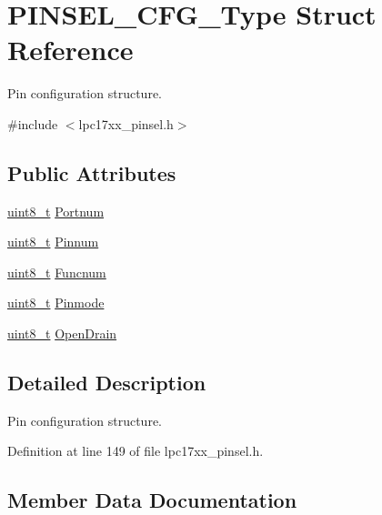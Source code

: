 \hypertarget{struct_p_i_n_s_e_l___c_f_g___type}{}\section{P\+I\+N\+S\+E\+L\+\_\+\+C\+F\+G\+\_\+\+Type Struct Reference}
\label{struct_p_i_n_s_e_l___c_f_g___type}


Pin configuration structure.  




{\ttfamily \#include $<$lpc17xx\+\_\+pinsel.\+h$>$}

\subsection*{Public Attributes}
\begin{DoxyCompactItemize}
\item 
\hyperlink{_p_e___types_8h_aba7bc1797add20fe3efdf37ced1182c5}{uint8\+\_\+t} \hyperlink{struct_p_i_n_s_e_l___c_f_g___type_a6b754912548dadd6634bb39c8b760fd1}{Portnum}
\item 
\hyperlink{_p_e___types_8h_aba7bc1797add20fe3efdf37ced1182c5}{uint8\+\_\+t} \hyperlink{struct_p_i_n_s_e_l___c_f_g___type_a6d439a871adb445a571aa28806593532}{Pinnum}
\item 
\hyperlink{_p_e___types_8h_aba7bc1797add20fe3efdf37ced1182c5}{uint8\+\_\+t} \hyperlink{struct_p_i_n_s_e_l___c_f_g___type_a3a18a3aab63914a40dad89c8272ad4f4}{Funcnum}
\item 
\hyperlink{_p_e___types_8h_aba7bc1797add20fe3efdf37ced1182c5}{uint8\+\_\+t} \hyperlink{struct_p_i_n_s_e_l___c_f_g___type_a04c559184af47bae47fd03f6e8430145}{Pinmode}
\item 
\hyperlink{_p_e___types_8h_aba7bc1797add20fe3efdf37ced1182c5}{uint8\+\_\+t} \hyperlink{struct_p_i_n_s_e_l___c_f_g___type_af5bbd6b617833ebc7d0da0ed8b8fe595}{Open\+Drain}
\end{DoxyCompactItemize}


\subsection{Detailed Description}
Pin configuration structure. 

Definition at line 149 of file lpc17xx\+\_\+pinsel.\+h.



\subsection{Member Data Documentation}
